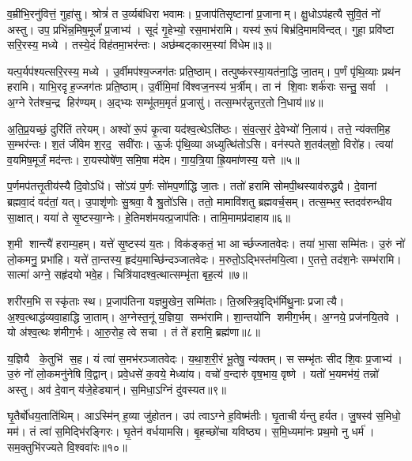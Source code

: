 व॒म्रीभि॒रनु॑वित्तं॒ गुहा॑सु।
श्रोत्रं॑ त उ॒र्व्यब॑धिरा भवामः।
प्र॒जाप॑तिसृष्टानां प्र॒जानाम्।
क्षु॒धोऽप॑हत्यै सुवि॒तं नो॑ अस्तु।
उप॒ प्रभि॑न्न॒मिष॒मूर्जं॑ प्र॒जाभ्य॑।
सूदं॑ गृ॒हेभ्यो॒ रस॒माभ॑रामि।
यस्य॑ रू॒पं बिभ्र॑दि॒मामवि॑न्दत्।
गुहा॒ प्रवि॑ष्टा सरि॒रस्य॒ मध्ये।
तस्ये॒दं विह॑तमा॒भर॑न्तः।
अछ॑म्बट्कारम॒स्यां वि॑धेम॥३॥

यत्प॒र्यप॑श्यत्सरि॒रस्य॒ मध्ये।
उ॒र्वीमप॑श्य॒ज्जग॑तः प्रति॒ष्ठाम्।
तत्पुष्क॑रस्या॒यत॑ना॒द्धि जा॒तम्।
प॒र्णं पृ॑थि॒व्याः प्रथ॑न हरामि।
याभि॒रदृह॒ज्जग॑तः प्रति॒ष्ठाम्।
उ॒र्वीमि॒मां वि॑श्वज॒नस्य॑ भ॒र्त्रीम्।
ता न॑ शि॒वाः शर्क॑राः सन्तु॒ सर्वा।
अ॒ग्ने रेत॑श्च॒न्द्र हिर॑ण्यम्।
अ॒द्भ्यः सम्भू॑तम॒मृतं॑ प्र॒जासु॑।
तत्स॒म्भर॑न्नुत्तर॒तो नि॒धाय॑॥४॥

अ॒ति॒प्र॒यच्छं॒ दुरि॑तिं तरेयम्।
अश्वो॑ रू॒पं कृ॒त्वा यद॑श्व॒त्थेऽति॑ष्ठः।
सं॒व॒त्स॒रं दे॒वेभ्यो॑ नि॒लाय॑।
तत्ते॒ न्य॑क्तमि॒ह स॒म्भर॑न्तः।
श॒तं जी॑वेम श॒रद॒ सवी॑राः।
ऊ॒र्जः पृ॑थि॒व्या अध्युत्थि॑तोऽसि।
वन॑स्पते श॒तव॑ल्‌शो॒ विरो॑ह।
त्वया॑ व॒यमिष॒मूर्जं॒ मद॑न्तः।
रा॒यस्पोषे॑ण॒ समि॒षा म॑देम।
गा॒य॒त्रि॒या ह्रि॒यमा॑णस्य॒ यत्ते॥५॥

प॒र्णमप॑तत्तृ॒तीय॑स्यै दि॒वोऽधि॑।
सो॑ऽयं प॒र्णः सो॑मप॒र्णाद्धि जा॒तः।
ततो॑ हरामि सोमपी॒थस्याव॑रुद्ध्यै।
दे॒वानां ब्रह्मवा॒दं वद॑तां॒ यत्।
उ॒पाशृ॑णोः सु॒श्रवा॒ वै श्रु॒तो॑ऽसि।
ततो॒ मामावि॑शतु ब्रह्मवर्च॒सम्।
तत्स॒म्भर॒स्तदव॑रुन्धीय सा॒क्षात्।
यया॑ ते सृ॒ष्टस्या॒ग्नेः।
हे॒तिमश॑मयत्प्र॒जाप॑तिः।
तामि॒मामप्र॑दाहाय॥६॥

श॒मी शान्त्यै॑ हराम्य॒हम्।
यत्ते॑ सृ॒ष्टस्य॑ य॒तः।
विक॑ङ्कतं॒ भा आर्च्छज्जातवेदः।
तया॑ भा॒सा सम्मि॑तः।
उ॒रुं नो॑ लो॒कमनु॒ प्रभा॑हि।
यत्ते॑ ता॒न्तस्य॒ हृद॑य॒माच्छि॑न्दञ्जातवेदः।
म॒रुतो॒ऽद्भिस्त॑मयि॒त्वा।
ए॒तत्ते॒ तद॑श॒नेः सम्भ॑रामि।
सात्मा॑ अग्ने॒ सहृ॑दयो भवे॒ह।
चित्रि॑यादश्व॒त्थात्सम्भृ॑ता बृह॒त्य॑॥७॥

शरी॑रम॒भि सस्कृ॑ताः स्थ।
प्र॒जाप॑तिना यज्ञमु॒खेन॒ सम्मि॑ताः।
ति॒स्रस्त्रि॒वृद्भि॑र्मिथु॒नाः प्रजात्यै।
अ॒श्व॒त्थाद्ध॑व्य\-वा॒हाद्धि जा॒ताम्।
अ॒ग्नेस्त॒नूं य॒ज्ञिया॒ सम्भ॑रामि।
शा॒न्तयो॑नि शमीग॒र्भम्।
अ॒ग्नये॒ प्रज॑नयि॒तवे।
यो अ॑श्व॒त्थः श॑मीग॒र्भः।
आ॒रु॒रोह॒ त्वे सचा।
तं ते॑ हरामि॒ ब्रह्म॑णा॥८॥

य॒ज्ञियै के॒तुभि॑ स॒ह।
यं त्वा॑ स॒मभ॑रञ्जातवेदः।
य॒था॒श॒री॒रं भू॒तेषु॒ न्य॑क्तम्।
स सम्भृ॑तः सीद शि॒वः प्र॒जाभ्य॑।
उ॒रुं नो॑ लो॒कमनु॑नेषि वि॒द्वान्।
प्रवे॒धसे॑ क॒वये॒ मेध्या॑य।
वचो॑ व॒न्दारु॑ वृष॒भाय॒ वृष्णे।
यतो॑ भ॒यमभ॑यं॒ तन्नो॑ अस्तु।
अव॑ दे॒वान् य॑जे॒हेड्यान्॑।
स॒मिधा॒ऽग्निं दु॑वस्यत॥९॥

घृ॒तैर्बो॑धय॒ताति॑थिम्।
आऽस्मि॑न् ह॒व्या जु॑होतन।
उप॑ त्वाऽग्ने ह॒विष्म॑तीः।
घृ॒ताचीर्यन्तु हर्यत।
जु॒षस्व॑ स॒मिधो॒ मम॑।
तं त्वा॑ स॒मिद्भि॑रङ्गिरः।
घृ॒तेन॑ वर्धयामसि।
बृ॒हच्छो॑चा यविष्ठ्य।
स॒मि॒ध्यमा॑नः प्रथ॒मो नु धर्म॑।
सम॒क्तुभि॑रज्यते वि॒श्ववा॑रः॥१०॥


